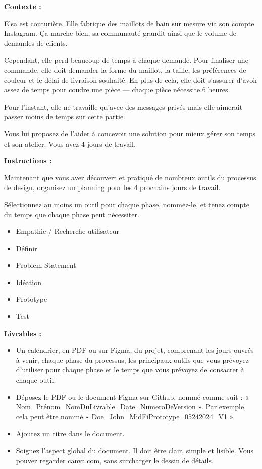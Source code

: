 \makeheaderfiles

\textbf{Contexte :}

Elsa est couturière. Elle fabrique des maillots de bain sur mesure via son compte Instagram. Ça marche bien, sa communauté grandit ainsi que le volume de demandes de clients.

Cependant, elle perd beaucoup de temps à chaque demande. Pour finaliser une commande, elle doit demander la forme du maillot, la taille, les préférences de couleur et le délai de livraison souhaité. En plus de cela, elle doit s'assurer d'avoir assez de temps pour coudre une pièce  ---  chaque pièce nécessite 6 heures.

Pour l'instant, elle ne travaille qu'avec des messages privés mais elle aimerait passer moins de temps sur cette partie.

Vous lui proposez de l'aider à concevoir une solution pour mieux gérer son temps et son atelier. Vous avez 4 jours de travail.

\textbf{Instructions :}

Maintenant que vous avez découvert et pratiqué de nombreux outils du processus de design, organisez un planning pour les 4 prochains jours de travail.

Sélectionnez au moins un outil pour chaque phase, nommez-le, et tenez compte du temps que chaque phase peut nécessiter.

\begin{itemize}
\item Empathie / Recherche utilisateur
\item Définir
\item Problem Statement
\item Idéation
\item Prototype
\item Test
\end{itemize}

\textbf{Livrables :}

\begin{itemize}
\item Un calendrier, en PDF ou sur Figma, du projet, comprenant les jours ouvrés à venir, chaque phase du processus, les principaux outils que vous prévoyez d'utiliser pour chaque phase et le temps que vous prévoyez de consacrer à chaque outil.
\item Déposez le PDF ou le document Figma sur Github, nommé comme suit : « Nom\_Prénom\_NomDuLivrable\_Date\_NumeroDeVersion ». Par exemple, cela peut être nommé « Doe\_John\_MidFiPrototype\_05242024\_V1 ».
\item Ajoutez un titre dans le document.
\item Soignez l'aspect global du document. Il doit être clair, simple et lisible. Vous pouvez regarder canva.com, sans surcharger le dessin de détails.
\end{itemize}

